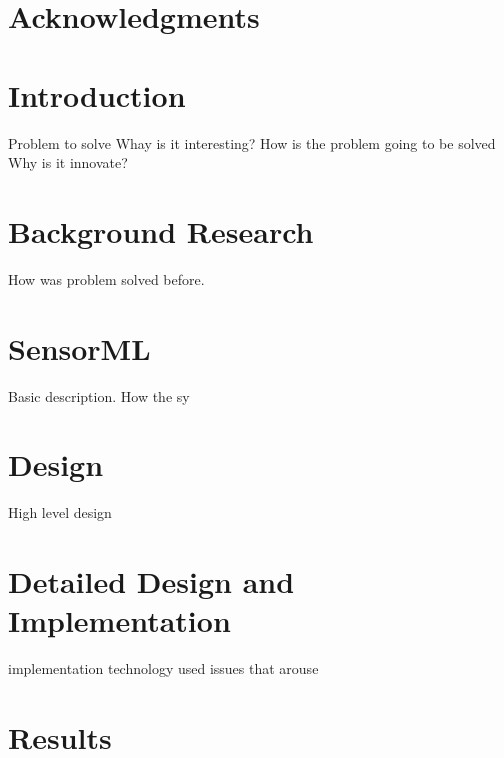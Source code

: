 \documentclass[]{final_report}
\begin{document}
\maketitle
\tableofcontents{}\newpage


\begin{abstract}



\end{abstract}
\newpage



\chapter*{Acknowledgments}



\chapter{Introduction}


Problem to solve
Whay is it interesting?
How is the problem going to be solved
Why is it innovate?


\chapter{ Background Research}

How was problem solved before.


\chapter{SensorML}
Basic description.
How the sy

\chapter{Design}
High level design

\chapter{ Detailed Design and Implementation}

implementation technology used
issues that arouse

\chapter{Results}
\end{document}
